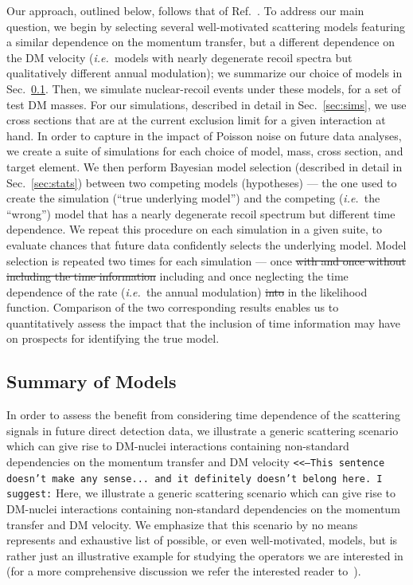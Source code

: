 \documentclass[11pt]{article}
\newcommand{\ie}{{\it i.e.~}}  \newcommand{\eg}{{\it e.g.~}}
\newcommand{\Sec}[1]{Sec.~\ref{#1}} \newcommand{\Secs}[2]{Secs.~\ref{#1} and \ref{#2}} \newcommand{\Secm}[2]{Secs.~\ref{#1} through \ref{#2}}
\newcommand{\sjwColor}{red}
\newcommand{\sjw}[1]{{\color{\sjwColor} #1}}
\newcommand{\sjwrm}[1]{{\color{\sjwColor}\protect\sout{#1}}}
\newcommand{\sjwtt}[1]{{\color{\sjwColor}\tt #1}}
\begin{document}
Our approach, outlined below, follows that of Ref.~\cite{Gluscevic:2015sqa}. To address our main question, we begin by selecting several well-motivated scattering models featuring a similar dependence on the momentum transfer, but a different dependence on the DM velocity (\ie models with nearly degenerate recoil spectra but qualitatively different annual modulation); we summarize our choice of models in \Sec{sec:models}. Then, we simulate nuclear-recoil events under these models, for a set of test DM masses. For our simulations, described in detail in \Sec{sec:sims}, we use cross sections that are at the current exclusion limit for a given interaction at hand. In order to capture in the impact of Poisson noise on future data analyses, we create a suite of simulations for each choice of model, mass, cross section, and target element. We then perform Bayesian model selection (described in detail in \Sec{sec:stats}) between two competing models (hypotheses) --- the one used to create the simulation (``true underlying model'') and the competing \sjw{(\ie the ``wrong'')} model that has a nearly degenerate recoil spectrum but different time dependence.  We repeat this procedure on each simulation in a given suite, to evaluate chances that future data confidently selects the underlying model. Model selection is repeated two times for each simulation --- once \sjwrm{with and once without including the time information}\sjw{including and once neglecting the time dependence of the rate} (\ie the annual modulation) \sjwrm{into}\sjw{in} the likelihood function. Comparison of the two corresponding results enables us to quantitatively assess the impact that the inclusion of time information may have on prospects for identifying the true model. 
 
 
\subsection{Summary of Models}\label{sec:models}

In order to assess the benefit from considering time dependence of the scattering signals in future direct detection data, we illustrate a generic scattering scenario which can give rise to DM-nuclei interactions containing non-standard dependencies on the momentum transfer and DM velocity \sjwtt{<<---This sentence doesn't make any sense... and it definitely doesn't belong here. I suggest:} \sjw{Here, we illustrate a generic scattering scenario which can give rise to DM-nuclei interactions containing non-standard dependencies on the momentum transfer and DM velocity}. We emphasize that this scenario by no means represents and exhaustive list of possible, or even well-motivated, models, but is rather just an illustrative example for studying the operators we are interested in (for a more comprehensive discussion we refer the interested reader to~\cite{Gresham:2014vja,Gluscevic:2015sqa}). 
\end{document}
